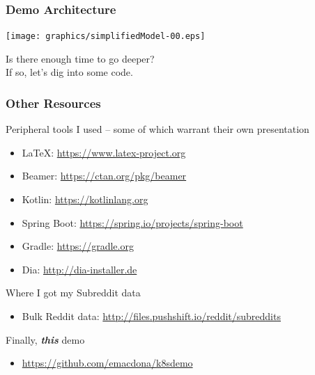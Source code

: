     \begin{frame}
        \frametitle{Demo Architecture}
        \texttt{[image: graphics/simplifiedModel-00.eps]}
    \end{frame}

    \begin{frame}
        \begin{center}
            \Huge Is there enough time to go deeper?\\
            If so, let's dig into some code.
        \end{center}
    \end{frame}

    \begin{frame}
        \frametitle{Other Resources}
        Peripheral tools I used -- some of which warrant their own presentation
        \begin{itemize}
            \item \LaTeX: \href{https://www.latex-project.org}{https://www.latex-project.org}
            \item Beamer: \href{https://ctan.org/pkg/beamer}{https://ctan.org/pkg/beamer}
            \item Kotlin: \href{https://kotlinlang.org}{https://kotlinlang.org}
            \item Spring Boot: \href{https://spring.io/projects/spring-boot}{https://spring.io/projects/spring-boot}
            \item Gradle: \href{https://gradle.org}{https://gradle.org}
            \item Dia: \href{http://dia-installer.de}{http://dia-installer.de}
        \end{itemize}
        \smallskip
        Where I got my Subreddit data
        \begin{itemize}
            \item Bulk Reddit data: \href{http://files.pushshift.io/reddit/subreddits}{http://files.pushshift.io/reddit/subreddits}
        \end{itemize}
        Finally, \textbf{\textit{this}} demo
        \begin{itemize}
            \item \href{https://github.com/emacdona/k8sdemo}{https://github.com/emacdona/k8sdemo}
        \end{itemize}
    \end{frame}

